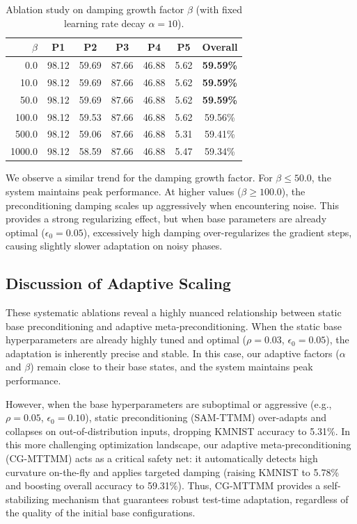 \documentclass{article}
\theoremstyle{plain}
\theoremstyle{definition}
\theoremstyle{remark}
\begin{document}
\begin{table}[h]
\caption{Ablation study on damping growth factor $\beta$ (with fixed learning rate decay $\alpha=10$).}
\label{tab:ablation_beta}
\centering
\begin{small}
\setlength{\tabcolsep}{4.5pt}
\begin{tabular}{rcccccc}
\toprule
\textbf{$\beta$} & \textbf{P1} & \textbf{P2} & \textbf{P3} & \textbf{P4} & \textbf{P5} & \textbf{Overall} \\
\midrule
0.0    & 98.12 & 59.69 & 87.66 & 46.88 & 5.62 & \textbf{59.59\%} \\
10.0   & 98.12 & 59.69 & 87.66 & 46.88 & 5.62 & \textbf{59.59\%} \\
50.0   & 98.12 & 59.69 & 87.66 & 46.88 & 5.62 & \textbf{59.59\%} \\
100.0  & 98.12 & 59.53 & 87.66 & 46.88 & 5.62 & 59.56\% \\
500.0  & 98.12 & 59.06 & 87.66 & 46.88 & 5.31 & 59.41\% \\
1000.0 & 98.12 & 58.59 & 87.66 & 46.88 & 5.47 & 59.34\% \\
\bottomrule
\end{tabular}
\end{small}
\end{table}

We observe a similar trend for the damping growth factor. For $\beta \le 50.0$, the system maintains peak performance. At higher values ($\beta \ge 100.0$), the preconditioning damping scales up aggressively when encountering noise. This provides a strong regularizing effect, but when base parameters are already optimal ($\epsilon_0=0.05$), excessively high damping over-regularizes the gradient steps, causing slightly slower adaptation on noisy phases. 

\subsection{Discussion of Adaptive Scaling}
These systematic ablations reveal a highly nuanced relationship between static base preconditioning and adaptive meta-preconditioning. 
When the static base hyperparameters are already highly tuned and optimal ($\rho=0.03$, $\epsilon_0=0.05$), the adaptation is inherently precise and stable. In this case, our adaptive factors ($\alpha$ and $\beta$) remain close to their base states, and the system maintains peak performance.

However, when the base hyperparameters are suboptimal or aggressive (e.g., $\rho=0.05$, $\epsilon_0=0.10$), static preconditioning (SAM-TTMM) over-adapts and collapses on out-of-distribution inputs, dropping KMNIST accuracy to 5.31\%. In this more challenging optimization landscape, our adaptive meta-preconditioning (CG-MTTMM) acts as a critical safety net: it automatically detects high curvature on-the-fly and applies targeted damping (raising KMNIST to 5.78\% and boosting overall accuracy to 59.31\%). Thus, CG-MTTMM provides a self-stabilizing mechanism that guarantees robust test-time adaptation, regardless of the quality of the initial base configurations.
\end{document}
